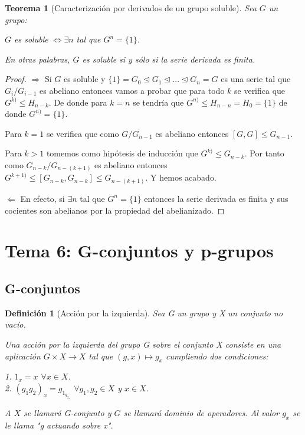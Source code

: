 \documentclass{article}
\theoremstyle{theorem-style}  %
\newtheorem{theorem}{Teorema}[section]  %
\theoremstyle{definition-style}
\newtheorem{definition}{Definición}[section]
\theoremstyle{example-style}
\begin{document}
\begin{theorem}[Caracterización por derivados de un grupo soluble]
Sea $G$ un grupo:

$G$ es soluble $\iff \exists n $ tal que $G^{n} = \{1\}$.

En otras palabras, $G$ es soluble si y sólo si la serie derivada es finita.
\end{theorem}
\begin{proof}
$\Rightarrow$ Si $G$ es soluble y $\{1\} = G_0 \trianglelefteq G_1 \trianglelefteq ... \trianglelefteq G_n = G$ es una serie tal que $G_i/G_{i-1}$ es abeliano entonces vamos a probar que para todo $k$ se verifica que $G^{k)} \le H_{n-k}$. De donde para $k = n$ se tendría que $G^{n)} \le H_{n-n} = H_0 = \{1\}$ de donde $G^{n)} = \{1\}$.

Para $k = 1$ se verifica que como $G/G_{n-1}$ es abeliano entonces $[G,G]  \le G_{n-1}$. 

Para $k > 1$ tomemos como hipótesis de inducción que $G^{k)} \le G_{n-k}$. Por tanto como $G_{n-k}/G_{n-(k+1)}$ es abeliano entonces $G^{k+1)} \le [G_{n-k},G_{n-k}] \le G_{n-(k+1)}$. Y hemos acabado.

$\Leftarrow$ En efecto, si $\exists n $ tal que $G^{n} = \{1\}$ entonces la serie derivada es finita y sus cocientes son abelianos por la propiedad del abelianizado.
\end{proof}

\newpage

\section{Tema 6: G-conjuntos y p-grupos}

\subsection{G-conjuntos}

\begin{definition}[Acción por la izquierda]
Sea G un grupo y X un conjunto no vacío.

Una acción por la izquierda del grupo G sobre el conjunto X consiste en una aplicación $G \times X \rightarrow X$ tal que $(g,x) \mapsto g_x$ cumpliendo dos condiciones:

1. $1_x = x$ $\forall x \in X$.\\
2. $(g_1g_2)_x = g_{1_{g_{2_x}}}$ $\forall g_1,g_2 \in X$ y $x \in X$.

A $X$ se llamará G-conjunto y $G$ se llamará dominio de operadores. Al valor $g_x$ se le llama "g actuando sobre x". 
\end{definition}
\end{document}
